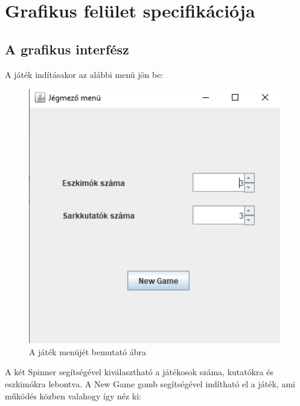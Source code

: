 %
\chapter{Grafikus felület specifikációja}

\thispagestyle{fancy}

\section{A grafikus interfész}

A játék indításakor az alábbi menü jön be:

\begin{figure}[H]
	\begin{center}
		\includegraphics[width=11cm]{chapters/chapter11/res/menu.png}
		\caption{A játék menüjét bemutató ábra}
		\label{fig:Menu}
	\end{center}
\end{figure}

A két Spinner segítségével kiválasztható a játékosok száma, kutatókra és eszkimókra lebontva.
A New Game gomb segítségével indítható el a játék, ami működés közben valahogy így néz ki:


